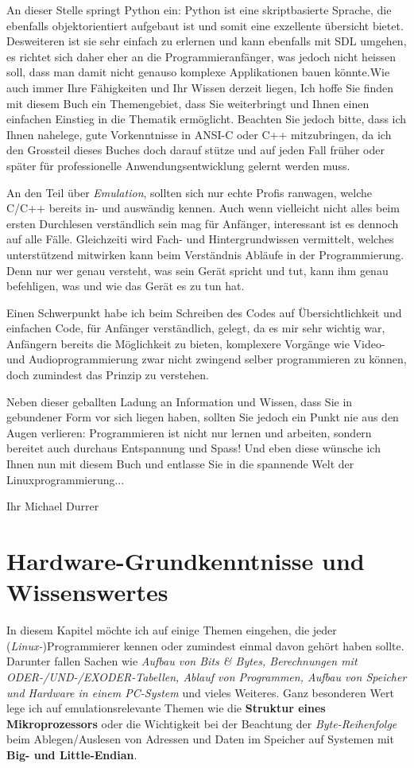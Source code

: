 \documentclass[b5paper,10pt,dvips,fleqn,titlepage,twoside]{book}
\begin{document}
An dieser Stelle springt Python ein: Python ist eine skriptbasierte Sprache, die ebenfalls objektorientiert aufgebaut ist und somit eine exzellente \"{u}bersicht bietet. Desweiteren ist sie sehr einfach zu erlernen und kann ebenfalls mit SDL umgehen, es richtet sich daher eher an die Programmieranf\"{a}nger, was jedoch nicht heissen soll, dass man damit nicht genauso komplexe Applikationen bauen k\"{o}nnte.\newline Wie auch immer Ihre F\"{a}higkeiten und Ihr Wissen derzeit liegen, Ich hoffe Sie finden mit diesem Buch ein Themengebiet, dass Sie weiterbringt und Ihnen einen einfachen Einstieg in die Thematik erm\"{o}glicht.
Beachten Sie jedoch bitte, dass ich Ihnen nahelege, gute Vorkenntnisse in ANSI-C oder C++ mitzubringen, da ich den Grossteil dieses Buches doch darauf st\"{u}tze und auf jeden Fall fr\"{u}her oder sp\"{a}ter f\"{u}r professionelle Anwendungsentwicklung gelernt werden muss.

An den Teil \"{u}ber \textit{Emulation}, sollten sich nur echte Profis ranwagen, welche C/C++ bereits in- und ausw\"{a}ndig kennen. Auch wenn vielleicht nicht alles beim ersten Durchlesen verst\"{a}ndlich sein mag f\"{u}r Anf\"{a}nger, interessant ist es dennoch auf alle Fälle. Gleichzeiti wird Fach- und Hintergrundwissen vermittelt, welches unterstützend mitwirken kann beim Verst\"{a}ndnis Abläufe in der Programmierung.
Denn nur wer genau versteht, was sein Gerät spricht und tut, kann ihm genau befehligen, was und wie das Gerät es zu tun hat.

Einen Schwerpunkt habe ich beim Schreiben des Codes auf Übersichtlichkeit und einfachen Code, für Anfänger verständlich, gelegt, da es mir sehr wichtig war, Anfängern bereits die Möglichkeit zu bieten, komplexere Vorgänge wie Video- und Audioprogrammierung zwar nicht zwingend selber programmieren zu können, doch zumindest das Prinzip zu verstehen.

Neben dieser geballten Ladung an Information und Wissen, dass Sie in gebundener Form vor sich liegen haben, sollten Sie jedoch ein Punkt nie aus den Augen verlieren: Programmieren ist nicht nur lernen und arbeiten, sondern bereitet auch durchaus Entspannung und Spass! Und eben diese w\"{u}nsche ich Ihnen nun mit diesem Buch und entlasse Sie in die spannende Welt der Linuxprogrammierung...


Ihr Michael Durrer
\newpage
\chapter{Hardware-Grundkenntnisse und Wissenswertes}
In diesem Kapitel möchte ich auf einige Themen eingehen, die jeder (\emph{Linux-})Programmierer kennen oder zumindest einmal davon gehört haben sollte. Darunter fallen Sachen wie \emph{Aufbau von Bits \& Bytes, Berechnungen mit ODER-/UND-/EXODER-Tabellen, Ablauf von Programmen, Aufbau von Speicher und Hardware in einem PC-System} und vieles Weiteres. Ganz besonderen Wert lege ich auf emulationsrelevante Themen wie die \textbf{Struktur eines Mikroprozessors} oder die Wichtigkeit bei der Beachtung der \emph{Byte-Reihenfolge} beim Ablegen/Auslesen von Adressen und Daten im Speicher auf Systemen mit \textbf{Big- und Little-Endian}.
\end{document}
